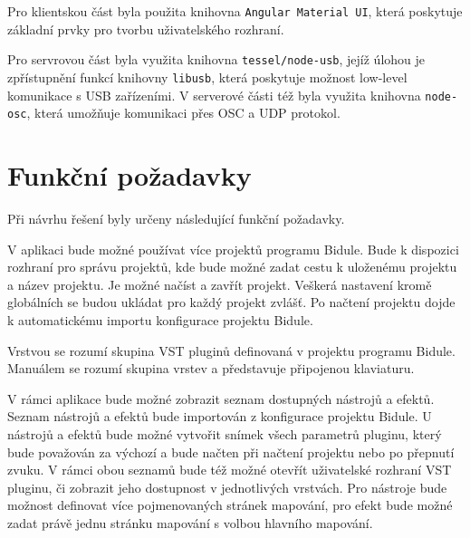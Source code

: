\documentclass[thesis=M,czech]{FITthesis}[2019/03/06]
\begin{document}
		Pro klientskou část byla použita knihovna \texttt{Angular Material UI}, která poskytuje základní prvky pro tvorbu uživatelského rozhraní.

		Pro servrovou část byla využita knihovna \texttt{tessel/node-usb}, jejíž úlohou je zpřístupnění funkcí knihovny \texttt{libusb}, která poskytuje možnost low-level komunikace s USB zařízeními\cite{libusb}.
		V serverové části též byla využita knihovna \texttt{node-osc}, která umožňuje komunikaci přes OSC a UDP protokol.
		
	\section{Funkční požadavky}
		Při návrhu řešení byly určeny následující funkční požadavky.
	
		V aplikaci bude možné používat více projektů programu Bidule. Bude k dispozici rozhraní pro správu projektů, kde bude možné
		zadat cestu k uloženému projektu a název projektu. Je možné načíst a zavřít projekt. Veškerá nastavení kromě globálních se budou ukládat 
		pro každý projekt zvlášť. Po načtení projektu dojde k automatickému importu konfigurace projektu Bidule.
		
		Vrstvou se rozumí skupina VST pluginů definovaná v projektu programu Bidule. Manuálem se rozumí skupina vrstev a představuje připojenou klaviaturu.

		V rámci aplikace bude možné zobrazit seznam dostupných nástrojů a efektů. Seznam nástrojů a efektů bude importován z konfigurace projektu Bidule.
		U nástrojů a efektů bude možné vytvořit snímek všech parametrů pluginu, který bude považován za výchozí a bude načten při načtení projektu nebo po přepnutí zvuku. V rámci obou seznamů bude též možné otevřít uživatelské rozhraní VST pluginu, či zobrazit jeho dostupnost v jednotlivých vrstvách. Pro nástroje bude možnost definovat více pojmenovaných stránek mapování, pro efekt bude možné zadat právě jednu stránku mapování s volbou hlavního mapování.
\end{document}
